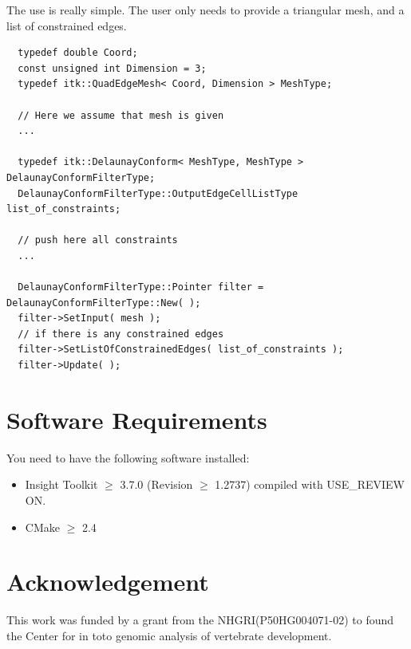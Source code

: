 \documentclass{InsightArticle}
\begin{document}
The use is really simple. The user only needs to provide a triangular mesh, and a list of constrained edges.

\begin{verbatim}
  typedef double Coord;
  const unsigned int Dimension = 3;
  typedef itk::QuadEdgeMesh< Coord, Dimension > MeshType;

  // Here we assume that mesh is given
  ...

  typedef itk::DelaunayConform< MeshType, MeshType > DelaunayConformFilterType;
  DelaunayConformFilterType::OutputEdgeCellListType list_of_constraints;
  
  // push here all constraints
  ...

  DelaunayConformFilterType::Pointer filter = DelaunayConformFilterType::New( );
  filter->SetInput( mesh );
  // if there is any constrained edges
  filter->SetListOfConstrainedEdges( list_of_constraints );
  filter->Update( );
\end{verbatim}

\section{Software Requirements}

You need to have the following software installed:

\begin{itemize}
  \item Insight Toolkit $\geq$ 3.7.0 (Revision $\geq$ 1.2737) compiled with USE\_REVIEW ON.
  \item CMake $\geq$ 2.4
\end{itemize}

\section*{Acknowledgement}
This work was funded by a grant from the NHGRI(P50HG004071-02) to found the Center for in toto genomic analysis of vertebrate development.

%
%



\end{document}
